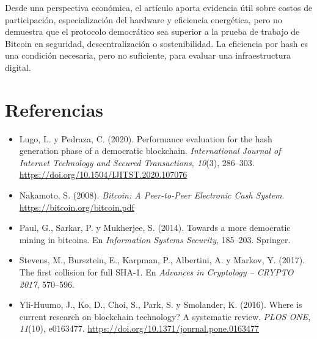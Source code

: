 \documentclass[spanish,11pt]{article}
\begin{document}
Desde una perspectiva económica, el artículo aporta evidencia útil 
sobre costos de participación, especialización del hardware y eficiencia energética, 
pero no demuestra que el protocolo democrático sea superior a la prueba de trabajo de Bitcoin 
en seguridad, descentralización o sostenibilidad. La eficiencia por hash es una condición 
necesaria, pero no suficiente, para evaluar una infraestructura digital. 

\section{Referencias}\label{referencias}

\begin{itemize}
  \setlength{\itemsep}{0pt}
  \item Lugo, L. y Pedraza, C. (2020). Performance evaluation for the hash
  generation phase of a democratic blockchain. \emph{International Journal
  of Internet Technology and Secured Transactions, 10}(3), 286--303.
  \url{https://doi.org/10.1504/IJITST.2020.107076}

  \item Nakamoto, S. (2008). \emph{Bitcoin: A Peer-to-Peer Electronic Cash
  System}. \url{https://bitcoin.org/bitcoin.pdf}

  \item Paul, G., Sarkar, P. y Mukherjee, S. (2014). Towards a more democratic
  mining in bitcoins. En \emph{Information Systems Security}, 185--203.
  Springer.

  \item Stevens, M., Bursztein, E., Karpman, P., Albertini, A. y Markov, Y.
  (2017). The first collision for full SHA-1. En \emph{Advances in Cryptology
  -- CRYPTO 2017}, 570--596.

  \item Yli-Huumo, J., Ko, D., Choi, S., Park, S. y Smolander, K. (2016).
  Where is current research on blockchain technology? A systematic review.
  \emph{PLOS ONE, 11}(10), e0163477.
  \url{https://doi.org/10.1371/journal.pone.0163477}
\end{itemize}
\end{document}
